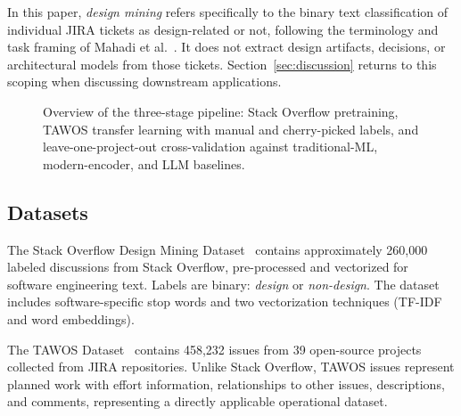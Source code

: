 \documentclass[preprint,12pt]{elsarticle}
\begin{document}
In this paper, \emph{design mining} refers specifically to the binary text classification of individual JIRA tickets as design-related or not, following the terminology and task framing of Mahadi et al.~\cite{mahadi2021}. It does not extract design artifacts, decisions, or architectural models from those tickets. Section~\ref{sec:discussion} returns to this scoping when discussing downstream applications.

\begin{figure}[t]
\centering
{}
\caption{Overview of the three-stage pipeline: Stack Overflow pretraining, TAWOS transfer learning with manual and cherry-picked labels, and leave-one-project-out cross-validation against traditional-ML, modern-encoder, and LLM baselines.}
\label{fig:pipeline}
\end{figure}

\subsection{Datasets}

The Stack Overflow Design Mining Dataset~\cite{mahadi2021} contains approximately 260,000 labeled discussions from Stack Overflow, pre-processed and vectorized for software engineering text. Labels are binary: \emph{design} or \emph{non-design}. The dataset includes software-specific stop words and two vectorization techniques (TF-IDF and word embeddings).

The TAWOS Dataset~\cite{tawosi2022tawos} contains 458,232 issues from 39 open-source projects collected from JIRA repositories. Unlike Stack Overflow, TAWOS issues represent planned work with effort information, relationships to other issues, descriptions, and comments, representing a directly applicable operational dataset.
\end{document}
